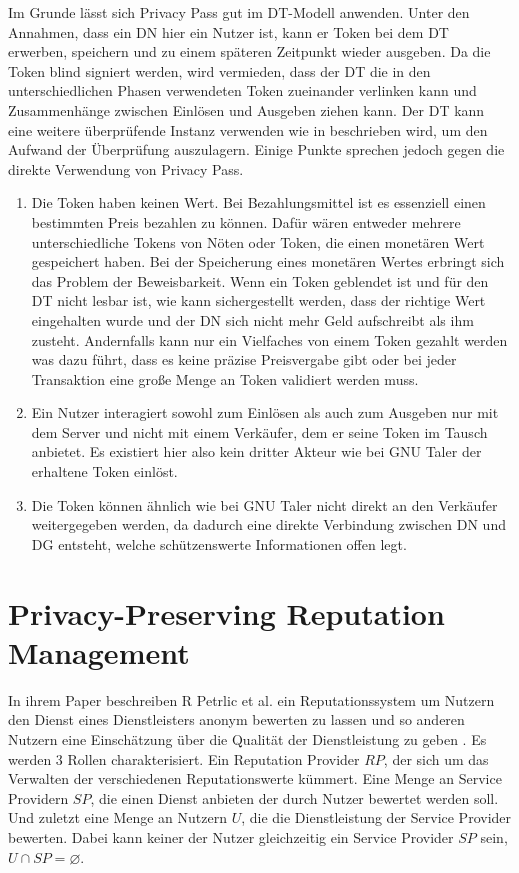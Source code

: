 \documentclass[
	fontsize=11pt,
	headings=small,
	parskip=half,           %
	bibliography=totoc,
	numbers=noenddot,       %
	open=any,               %
]{scrreprt}
\begin{document}
Im Grunde lässt sich Privacy Pass gut im DT-Modell anwenden. Unter den Annahmen, dass ein DN hier ein Nutzer ist, kann er Token bei dem DT erwerben, speichern und zu einem späteren Zeitpunkt wieder ausgeben. Da die Token blind signiert werden, wird vermieden, dass der DT die in den unterschiedlichen Phasen verwendeten Token zueinander verlinken kann und Zusammenhänge zwischen Einlösen und Ausgeben ziehen kann. Der DT kann eine weitere überprüfende Instanz verwenden wie in \cite{pp-davidson2018privacy} beschrieben wird, um den Aufwand der Überprüfung auszulagern. 
Einige Punkte sprechen jedoch gegen die direkte Verwendung von Privacy Pass. 
\begin{enumerate}
    \item Die Token haben keinen Wert. Bei Bezahlungsmittel ist es essenziell einen bestimmten Preis bezahlen zu können. Dafür wären entweder mehrere unterschiedliche Tokens von Nöten oder Token, die einen monetären Wert gespeichert haben. Bei der Speicherung eines monetären Wertes erbringt sich das Problem der Beweisbarkeit. Wenn ein Token geblendet ist und für den DT nicht lesbar ist, wie kann sichergestellt werden, dass der richtige Wert eingehalten wurde und der DN sich nicht mehr Geld aufschreibt als ihm zusteht. Andernfalls kann nur ein Vielfaches von einem Token gezahlt werden was dazu führt, dass es keine präzise Preisvergabe gibt oder bei jeder Transaktion eine große Menge an Token validiert werden muss.
    \item Ein Nutzer interagiert sowohl zum Einlösen als auch zum Ausgeben nur mit dem Server und nicht mit einem Verkäufer, dem er seine Token im Tausch anbietet. Es existiert hier also kein dritter Akteur wie bei GNU Taler der erhaltene Token einlöst.
    \item Die Token können ähnlich wie bei GNU Taler nicht direkt an den Verkäufer weitergegeben werden, da dadurch eine direkte Verbindung zwischen DN und DG entsteht, welche schützenswerte Informationen offen legt.
\end{enumerate}

\section{Privacy-Preserving Reputation Management}
\label{subsec:rep}
In ihrem Paper beschreiben R Petrlic et al. ein Reputationssystem um Nutzern den Dienst eines Dienstleisters anonym bewerten zu lassen und so anderen Nutzern eine Einschätzung über die Qualität der Dienstleistung zu geben \cite{petrlic2014privacy}. Es werden 3 Rollen charakterisiert. Ein Reputation Provider $RP$, der sich um das Verwalten der verschiedenen Reputationswerte kümmert. Eine Menge an Service Providern $SP$, die einen Dienst anbieten der durch Nutzer bewertet werden soll. Und zuletzt eine Menge an Nutzern $U$, die die Dienstleistung der Service Provider bewerten. Dabei kann keiner der Nutzer gleichzeitig ein Service Provider $SP$ sein, $U \cap SP = \varnothing$. 
\end{document}
